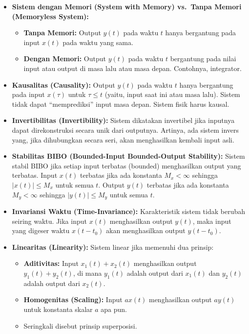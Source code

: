 \documentclass[
  letterpaper,
  DIV=11,
  numbers=noendperiod]{scrreprt}
\providecommand{\tightlist}{%
  \setlength{\itemsep}{0pt}\setlength{\parskip}{0pt}}
\begin{document}
\begin{itemize}
\item
  \textbf{Sistem dengan Memori (System with Memory) vs.~Tanpa Memori
  (Memoryless System):}

  \begin{itemize}
  \tightlist
  \item
    \textbf{Tanpa Memori:} Output \(y(t)\) pada waktu \(t\) hanya
    bergantung pada input \(x(t)\) pada waktu yang sama.
  \item
    \textbf{Dengan Memori:} Output \(y(t)\) pada waktu \(t\) bergantung
    pada nilai input atau output di masa lalu atau masa depan.
    Contohnya, integrator.
  \end{itemize}
\item
  \textbf{Kausalitas (Causality):} Output \(y(t)\) pada waktu \(t\)
  hanya bergantung pada input \(x(\tau)\) untuk \(\tau \le t\) (yaitu,
  input saat ini atau masa lalu). Sistem tidak dapat ``memprediksi''
  input masa depan. Sistem fisik harus kausal.
\item
  \textbf{Invertibilitas (Invertibility):} Sistem dikatakan invertibel
  jika inputnya dapat direkonstruksi secara unik dari outputnya.
  Artinya, ada sistem invers yang, jika dihubungkan secara seri, akan
  menghasilkan kembali input asli.
\item
  \textbf{Stabilitas BIBO (Bounded-Input Bounded-Output Stability):}
  Sistem stabil BIBO jika setiap input terbatas (bounded) menghasilkan
  output yang terbatas. Input \(x(t)\) terbatas jika ada konstanta
  \(M_x < \infty\) sehingga \(|x(t)| \le M_x\) untuk semua \(t\). Output
  \(y(t)\) terbatas jika ada konstanta \(M_y < \infty\) sehingga
  \(|y(t)| \le M_y\) untuk semua \(t\).
\item
  \textbf{Invariansi Waktu (Time-Invariance):} Karakteristik sistem
  tidak berubah seiring waktu. Jika input \(x(t)\) menghasilkan output
  \(y(t)\), maka input yang digeser waktu \(x(t-t_0)\) akan menghasilkan
  output \(y(t-t_0)\).
\item
  \textbf{Linearitas (Linearity):} Sistem linear jika memenuhi dua
  prinsip:

  \begin{itemize}
  \tightlist
  \item
    \textbf{Aditivitas:} Input \(x_1(t)+x_2(t)\) menghasilkan output
    \(y_1(t)+y_2(t)\), di mana \(y_1(t)\) adalah output dari \(x_1(t)\)
    dan \(y_2(t)\) adalah output dari \(x_2(t)\).
  \item
    \textbf{Homogenitas (Scaling):} Input \(a x(t)\) menghasilkan output
    \(a y(t)\) untuk konstanta skalar \(a\) apa pun.
  \item
    Seringkali disebut prinsip superposisi.
  \end{itemize}
\end{itemize}
\end{document}
